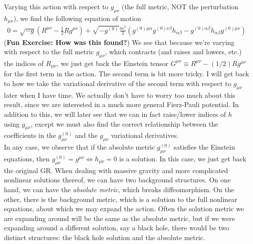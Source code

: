\documentclass{book}
\theoremstyle{definition}
\newcommand{\f}[2]{\frac{#1}{#2}}
\newcommand{\lp}{\left(}
\newcommand{\rp}{\right)}
\begin{document}
Varying this action with respect to $g_{\mu\nu}$ (the full metric, NOT the perturbation $h_{\mu\nu}$), we find the following equation of motion
\begin{align}
\boxed{0 = \sqrt{-g}\lp R^{\mu\nu} - \f{1}{2}Rg^{\mu\nu} \rp + \sqrt{-g^{(0)}}\f{m^2}{2}\lp g^{(0)\mu\alpha}g^{(0)\nu\beta}h_{\alpha\beta} - g^{(0)\alpha\beta}h_{\alpha\beta}g^{(0)\mu\nu}\rp}
\end{align} 
(\textbf{Fun Exercise: How was this found?}) We see that because we're varying with respect to the full metric $g_{\mu\nu}$, which contracts (and raises and lowers, etc.) the indices of $R_{\mu\nu}$, we just get back the Einstein tensor $G^{\mu\nu} \equiv R^{\mu\nu} - (1/2)Rg^{\mu\nu}$ for the first term in the action. The second term is bit more tricky. I will get back to how we take the variational derivative of the second term with respect to $g_{\mu\nu}$ later when I have time. We actually don't have to worry too much about this result, since we are interested in a much more general Fierz-Pauli potential. In addition to this, we will later see that we can in fact raise/lower indices of $h$ using $g_{\mu\nu}$, except we must also find the correct relationship between the coefficients in the $g^{(0)}_{\mu\nu}$ and the $g_{\mu\nu}$ variational derivatives.\\

In any case, we observe that if the absolute metric $g^{(0)}_{\mu\nu}$ satisfies the Einstein equations, then $g^{(0)}_{\mu\nu} = g^{\mu\nu} \iff h_{\mu\nu} = 0$ is a solution. In this case, we just get back the original GR. When dealing with massive gravity and more complicated nonlinear solutions thereof, we can have two background structures. On one hand, we can have the \textit{absolute metric}, which breaks diffeomorphism. On the other, there is the background metric, which is a solution to the full nonlinear equations, about which we may expand the action. Often the solution metric we are expanding around will be the same as the absolute metric, but if we were expanding around a different solution, say a black hole, there would be two distinct structures: the black hole solution and the absolute metric.  \\
\end{document}
